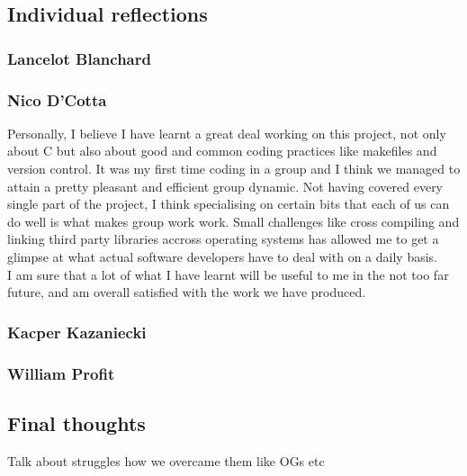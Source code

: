 \documentclass[11pt]{article}
\begin{document}
\subsection{Individual reflections}
\subsubsection{Lancelot Blanchard}
\subsubsection{Nico D'Cotta}
Personally, I believe I have learnt a great deal working on this project,
not only about C but also about good and common coding practices
like makefiles and version control.
It was my first time coding in a group and I think we managed
to attain a pretty pleasant and efficient group dynamic. Not having 
covered every single part of the project, I think specialising on certain bits
that each of us can do well is what makes group work work. Small challenges
like cross compiling and linking third party libraries accross operating systems
has allowed me to get a glimpse at what actual software developers have to deal
with on a daily basis. \\
I am sure that a lot of what I have learnt will be useful to me in the not too
far future, and am overall satisfied with the work we have produced.


\subsubsection{Kacper Kazaniecki}
\subsubsection{William Profit}
\subsection{Final thoughts}
Talk about struggles how we overcame them like OGs etc
\end{document}
